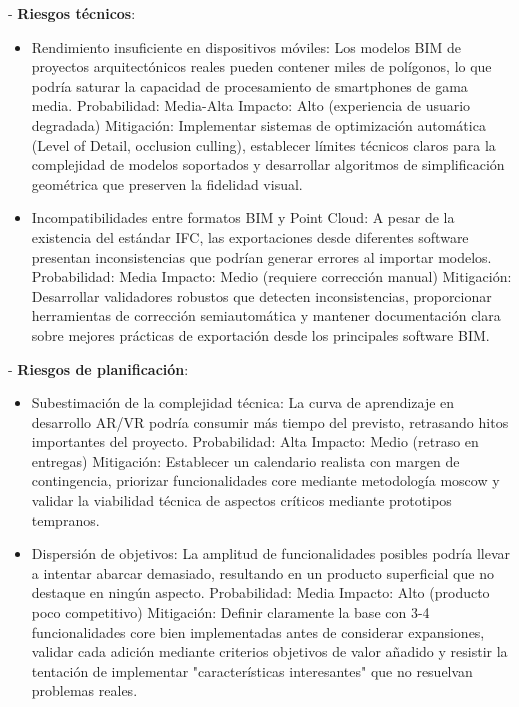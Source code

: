 - \textbf{Riesgos técnicos}:
\begin{itemize}
\item Rendimiento insuficiente en dispositivos móviles: Los modelos BIM de proyectos arquitectónicos reales pueden contener miles de polígonos, lo que podría saturar la capacidad de procesamiento de smartphones de gama media.
    Probabilidad: Media-Alta
    Impacto: Alto (experiencia de usuario degradada)
    Mitigación: Implementar sistemas de optimización automática (Level of Detail, occlusion culling), establecer límites técnicos claros para la complejidad de modelos soportados y desarrollar algoritmos de simplificación geométrica que preserven la fidelidad visual.
\item Incompatibilidades entre formatos BIM y Point Cloud: A pesar de la existencia del estándar IFC, las exportaciones desde diferentes software presentan inconsistencias que podrían generar errores al importar modelos.
    Probabilidad: Media
    Impacto: Medio (requiere corrección manual)
    Mitigación: Desarrollar validadores robustos que detecten inconsistencias, proporcionar herramientas de corrección semiautomática y mantener documentación clara sobre mejores prácticas de exportación desde los principales software BIM.
\end{itemize}
- \textbf{Riesgos de planificación}:
\begin{itemize}
\item Subestimación de la complejidad técnica: La curva de aprendizaje en desarrollo AR/VR podría consumir más tiempo del previsto, retrasando hitos importantes del proyecto.
    Probabilidad: Alta
    Impacto: Medio (retraso en entregas)
    Mitigación: Establecer un calendario realista con margen de contingencia, priorizar funcionalidades core mediante metodología \gls{moscow} y validar la viabilidad técnica de aspectos críticos mediante prototipos tempranos.

\item Dispersión de objetivos: La amplitud de funcionalidades posibles podría llevar a intentar abarcar demasiado, resultando en un producto superficial que no destaque en ningún aspecto.
    Probabilidad: Media
    Impacto: Alto (producto poco competitivo)
    Mitigación: Definir claramente la base con 3-4 funcionalidades core bien implementadas antes de considerar expansiones, validar cada adición mediante criterios objetivos de valor añadido y resistir la tentación de implementar "características interesantes" que no resuelvan problemas reales.
\end{itemize}

